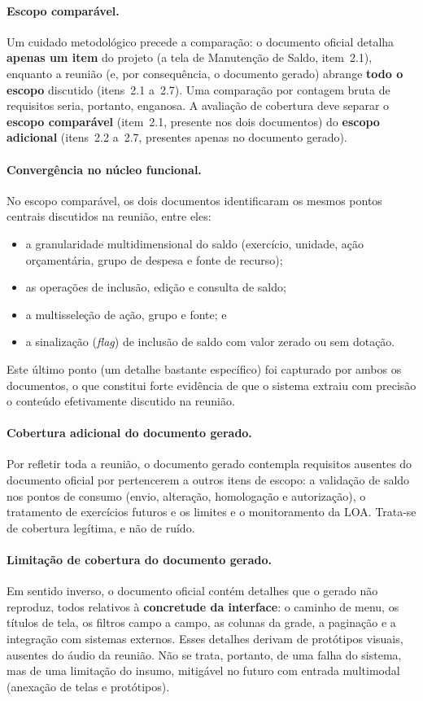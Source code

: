 \paragraph{Escopo comparável.}
Um cuidado metodológico precede a comparação: o documento oficial detalha \textbf{apenas um item} do projeto (a tela de Manutenção de Saldo, item~2.1), enquanto a reunião (e, por consequência, o documento gerado) abrange \textbf{todo o escopo} discutido (itens~2.1 a~2.7). Uma comparação por contagem bruta de requisitos seria, portanto, enganosa. A avaliação de cobertura deve separar o \textbf{escopo comparável} (item~2.1, presente nos dois documentos) do \textbf{escopo adicional} (itens~2.2 a~2.7, presentes apenas no documento gerado).

\paragraph{Convergência no núcleo funcional.}
No escopo comparável, os dois documentos identificaram os mesmos pontos centrais discutidos na reunião, entre eles:
\begin{itemize}
    \item a granularidade multidimensional do saldo (exercício, unidade, ação orçamentária, grupo de despesa e fonte de recurso);
    \item as operações de inclusão, edição e consulta de saldo;
    \item a multisseleção de ação, grupo e fonte; e
    \item a sinalização (\textit{flag}) de inclusão de saldo com valor zerado ou sem dotação.
\end{itemize}
Este último ponto (um detalhe bastante específico) foi capturado por ambos os documentos, o que constitui forte evidência de que o sistema extraiu com precisão o conteúdo efetivamente discutido na reunião.

\paragraph{Cobertura adicional do documento gerado.}
Por refletir toda a reunião, o documento gerado contempla requisitos ausentes do documento oficial por pertencerem a outros itens de escopo: a validação de saldo nos pontos de consumo (envio, alteração, homologação e autorização), o tratamento de exercícios futuros e os limites e o monitoramento da LOA. Trata-se de cobertura legítima, e não de ruído.

\paragraph{Limitação de cobertura do documento gerado.}
Em sentido inverso, o documento oficial contém detalhes que o gerado não reproduz, todos relativos à \textbf{concretude da interface}: o caminho de menu, os títulos de tela, os filtros campo a campo, as colunas da grade, a paginação e a integração com sistemas externos. Esses detalhes derivam de protótipos visuais, ausentes do áudio da reunião. Não se trata, portanto, de uma falha do sistema, mas de uma limitação do insumo, mitigável no futuro com entrada multimodal (anexação de telas e protótipos).

